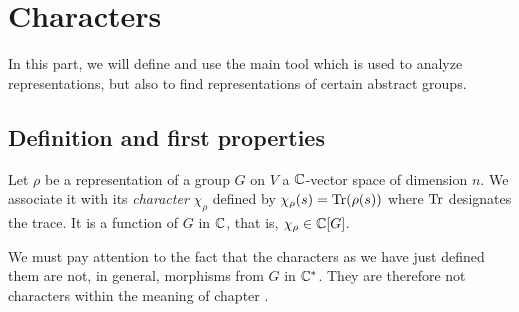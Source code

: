 \section{Characters}
 
In this part, we will define and use the main tool which is used to analyze representations, but also to find representations of certain abstract groups.
\subsection{Definition and first properties}
 
 
 
 
\begin{defn}[Characters]
  \label{notation-89} Let $ \rho $ be a representation of a group $G$ on $V$ a $ \mathbb{C}$-vector space of dimension $ n $. We associate it with its \textit{character} $ \chi_{\rho} $ defined by $ \chi_{\rho} (s) = \operatorname{Tr} (\rho (s)) $ where $ \operatorname{Tr} $ designates the trace. It is a function of $G$ in $ \mathbb{C} $, that is, $ \chi_{\rho} \in \mathbb{C} [G] $.
\end{defn}
 
 
\begin{rem}
We must pay attention to the fact that the characters as we have just defined them are not, in general, morphisms from $G$ in $ \mathbb{C}^* $. They are therefore not characters within the meaning of chapter .
\end{rem}
 
 
 
